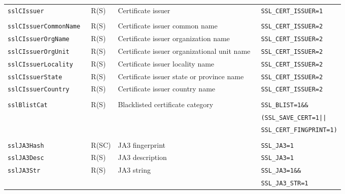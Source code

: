 \documentclass[documentation]{subfiles}
\begin{document}
\begin{longtable}{>{\tt}lll>{\tt\small}l}
    sslCIssuer                                   & R(S)          & Certificate issuer                             & SSL\_CERT\_ISSUER=1\\
    \\
    sslCIssuerCommonName                         & R(S)          & Certificate issuer common name                 & SSL\_CERT\_ISSUER=2\\
    sslCIssuerOrgName                            & R(S)          & Certificate issuer organization name           & SSL\_CERT\_ISSUER=2\\
    sslCIssuerOrgUnit                            & R(S)          & Certificate issuer organizational unit name    & SSL\_CERT\_ISSUER=2\\
    sslCIssuerLocality                           & R(S)          & Certificate issuer locality name               & SSL\_CERT\_ISSUER=2\\
    sslCIssuerState                              & R(S)          & Certificate issuer state or province name      & SSL\_CERT\_ISSUER=2\\
    sslCIssuerCountry                            & R(S)          & Certificate issuer country name                & SSL\_CERT\_ISSUER=2\\
    \\
    sslBlistCat                                  & R(S)          & Blacklisted certificate category               & SSL\_BLIST=1\&\&\\
                                                 &               &                                                & (SSL\_SAVE\_CERT=1||\\
                                                 &               &                                                & SSL\_CERT\_FINGPRINT=1)\\
    \\
    sslJA3Hash                                   & R(SC)         & JA3 fingerprint                                & SSL\_JA3=1\\
    sslJA3Desc                                   & R(S)          & JA3 description                                & SSL\_JA3=1\\
    sslJA3Str                                    & R(S)          & JA3 string                                     & SSL\_JA3=1\&\&\\
                                                 &               &                                                & SSL\_JA3\_STR=1\\

\end{longtable}
\end{document}
